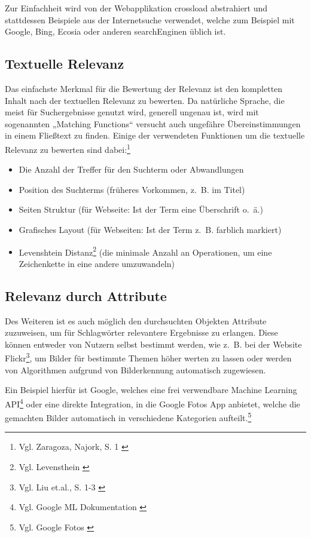 Zur Einfachheit wird von der Webapplikation \gls{crossload} abstrahiert und stattdessen Beispiele aus der Internetsuche verwendet, welche zum Beispiel mit Google, Bing, Ecosia oder anderen \gls{searchEngine}n üblich ist.

\subsection{Textuelle Relevanz}
\label{sub:relevanceText}
Das einfachste Merkmal für die Bewertung der Relevanz ist den kompletten Inhalt nach der textuellen Relevanz zu bewerten.
Da natürliche Sprache, die meist für Suchergebnisse genutzt wird, generell ungenau ist, wird mit sogenannten „Matching Functions“ versucht auch ungefähre Übereinstimmungen in einem Fließtext zu finden.
Einige der verwendeten Funktionen um die textuelle Relevanz zu bewerten sind dabei:\footnote{Vgl. Zaragoza, Najork, S. 1 \cite{zaragoza2018}}

\begin{itemize}
  \item Die Anzahl der Treffer für den Suchterm oder Abwandlungen
  \item Position des Suchterms (früheres Vorkommen, z. B. im Titel)
  \item Seiten Struktur (für Webseite: Ist der Term eine Überschrift o. ä.)
  \item Grafisches Layout (für Webseiten: Ist der Term z. B. farblich markiert)
  \item Levenshtein Distanz\footnote{Vgl. Levensthein \cite{levenshtein1966binary}} (die minimale Anzahl an Operationen, um eine Zeichenkette in eine andere umzuwandeln)
\end{itemize}

\subsection{Relevanz durch Attribute}
\label{sub:relevanceAttribute}
Des Weiteren ist es auch möglich den durchsuchten Objekten Attribute zuzuweisen, um für Schlagwörter relevantere Ergebnisse zu erlangen.
Diese können entweder von Nutzern selbst bestimmt werden, wie z. B. bei der Website Flickr\footnote{Vgl. Liu et.al., S. 1-3 \cite{liu2009}}, um Bilder für bestimmte Themen höher werten zu lassen oder werden von Algorithmen aufgrund von Bilderkennung automatisch zugewiesen.

Ein Beispiel hierfür ist Google, welches eine frei verwendbare Machine Learning API\footnote{Vgl. Google ML Dokumentation \cite{googledevelopers2022}} oder eine direkte Integration, in die Google Fotos App anbietet, welche die gemachten Bilder automatisch in verschiedene Kategorien aufteilt.\footnote{Vgl. Google Fotos \cite{googlephotos2022}}

